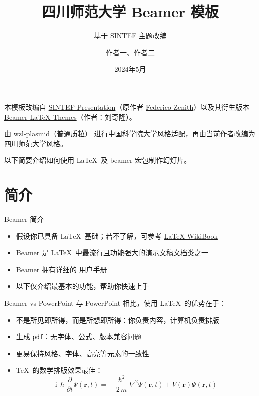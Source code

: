 \documentclass{beamer}
\title{四川师范大学 Beamer 模板}
\subtitle{基于 SINTEF 主题改编}
\author{作者一、作者二}
\date{2024年5月}
\newcommand{\hrefcol}[2]{\textcolor{cyan}{\href{#1}{#2}}}
\begin{document}
\maketitle

\begin{frame}

本模板改编自 \hrefcol{https://www.overleaf.com/latex/templates/sintef-presentation/jhbhdffczpnx}{SINTEF Presentation}（原作者 \hrefcol{mailto:federico.zenith@sintef.no}{Federico Zenith}）以及其衍生版本 \hrefcol{https://github.com/TOB-KNPOB/Beamer-LaTeX-Themes}{Beamer-LaTeX-Themes}（作者：刘奇隆）。

\vspace{\baselineskip}

由 \hrefcol{https://github.com/wzl-plasmid}{wzl-plasmid（普通质粒）} 进行中国科学院大学风格适配，再由当前作者改编为四川师范大学风格。

\vspace{\baselineskip}

以下简要介绍如何使用 \LaTeX\ 及 beamer 宏包制作幻灯片。

\end{frame}

\section{简介}

\begin{frame}{Beamer 简介}
\begin{itemize}
\item 假设你已具备 \LaTeX\ 基础；若不了解，可参考 \hrefcol{http://en.wikibooks.org/wiki/LaTeX/}{LaTeX WikiBook}
\item Beamer 是 \LaTeX\ 中最流行且功能强大的演示文稿文档类之一
\item Beamer 拥有详细的 \hrefcol{http://www.ctan.org/tex-archive/macros/latex/contrib/beamer/doc/beameruserguide.pdf}{用户手册}
\item 以下仅介绍最基本的功能，帮助你快速上手
\end{itemize}
\end{frame}

\begin{frame}{Beamer vs PowerPoint}
与 PowerPoint 相比，使用 \LaTeX\ 的优势在于：
\begin{itemize}
\item 不是所见即所得，而是所想即所得：你负责内容，计算机负责排版
\item 生成 \texttt{pdf}：无字体、公式、版本兼容问题
\item 更易保持风格、字体、高亮等元素的一致性
\item \TeX\ 的数学排版效果最佳：
\begin{equation*}
\mathrm{i}\,\hslash\frac{\partial}{\partial t} \Psi(\mathbf{r},t) =
-\frac{\hslash^2}{2\,m}\nabla^2\Psi(\mathbf{r},t)
+ V(\mathbf{r})\Psi(\mathbf{r},t)
\end{equation*}

\end{itemize}
\end{frame}
\end{document}
